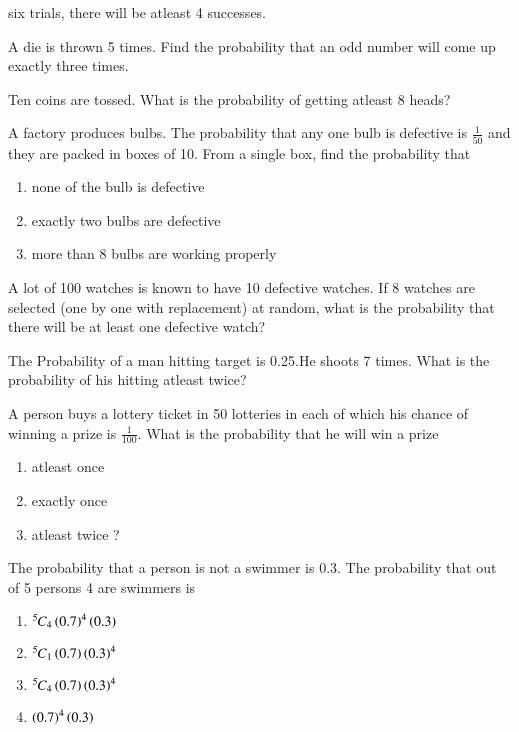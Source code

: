 six trials, there will be atleast 4 successes.
\solution
\item A die is thrown 5 times. Find the probability that an odd number will come up exactly three times.
		\solution
\item Ten coins are tossed. What is the probability of getting atleast 8 heads?
\\
\solution 

\item A factory produces bulbs. The probability that any one bulb is defective is $\frac{1}{50}$ and they are packed in boxes of 10. From a single box, find the probability that
\begin{enumerate}
\item none of the bulb is defective 
\item exactly two bulbs are defective 
\item more than 8 bulbs are working properly
\end{enumerate}
\solution

\item A lot of 100 watches is known to have 10 defective watches. If 8 watches are
selected (one by one with replacement) at random, what is the probability that
there will be at least one defective watch?
\item The Probability of a man hitting  target is 0.25.He shoots 7 times. What is the probability of his hitting atleast twice?\\
\item A person buys a lottery ticket in 50 lotteries in each of which his chance of winning a prize is $\frac{1}{100}$. What is the probability that he will win a prize
\begin{enumerate}[label=(\alph*)]
 \item  atleast once 
 \item exactly once 
 \item atleast twice ?
\end{enumerate}

\item The probability that a person is not a swimmer is 0.3. The probability that out of
5 persons 4 are swimmers is
\begin{enumerate}
\item ${{}^{5}\mkern-1muC_{4}}\left(0.7\right)^4\left(0.3\right)$
\item ${{}^{5}\mkern-1muC_{1}}\left(0.7\right)\left(0.3\right)^4$
\item ${{}^{5}\mkern-1muC_{4}}\left(0.7\right)\left(0.3\right)^4$
\item $\left(0.7\right)^4\left(0.3\right)$
\end{enumerate}
